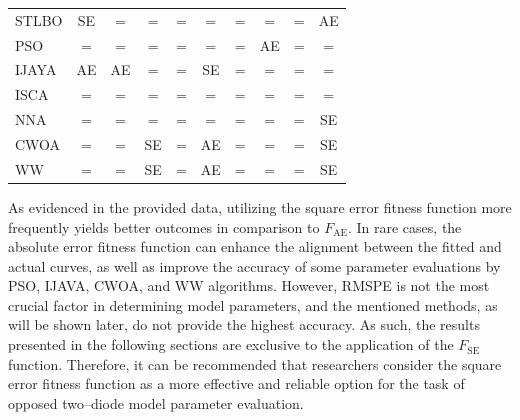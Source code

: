 \documentclass[a4paper,fleqn]{cas-dc}
\begin{document}
\begin{table}[<options>]
\begin{tabular*}{\tblwidth}{@{}LCCCCCCCCC@{}}
STLBO &SE &=  &=  &=  &=  &=  &=  &=  & AE \\
PSO &=  &=  &=  &=  &=  &=  & AE &=  &=  \\
IJAYA & AE & AE & = &=  &SE & = & = &=  &=  \\
ISCA &=  &=  &=  &=  &=  &=  &=  &=  &=  \\
NNA &=  &=  &=  &=  &=  &=  &=  &=  & SE\\
CWOA &=  &=  & SE&=  &  AE&=  &=  &=  &SE \\
WW &=  &=  & SE& = & AE & = &=  &=  & SE\\
\bottomrule
\end{tabular*}
\end{table}

As evidenced in the provided data, utilizing the square error fitness function more frequently yields better outcomes in comparison to $F_\mathrm{AE}$.
In rare cases, the absolute error fitness function can enhance the alignment between the fitted and actual curves,
as well as improve the accuracy of some parameter evaluations by PSO, IJAVA, CWOA, and WW algorithms.
However, RMSPE is not the most crucial factor in determining model parameters, and the mentioned methods,
as will be shown later, do not provide the highest accuracy.
As such, the results presented in the following sections are exclusive to the application of the $F_\mathrm{SE}$ function.
Therefore, it can be recommended that researchers consider
the square error fitness function as a more effective and reliable option for the task of opposed two--diode model parameter evaluation.
\end{document}
